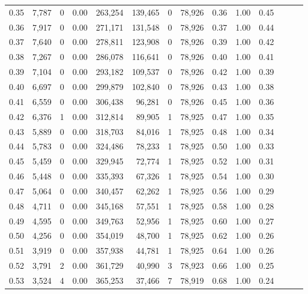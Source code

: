 \begin{tabular}{rrrrrrrrrrrrrr}
0.35 &  7,787 &      0 &  0.00 &  263,254 &  139,465 &       0 &  78,926 &  0.36 &  1.00 &      0.45 \\
0.36 &  7,917 &      0 &  0.00 &  271,171 &  131,548 &       0 &  78,926 &  0.37 &  1.00 &      0.44 \\
0.37 &  7,640 &      0 &  0.00 &  278,811 &  123,908 &       0 &  78,926 &  0.39 &  1.00 &      0.42 \\
0.38 &  7,267 &      0 &  0.00 &  286,078 &  116,641 &       0 &  78,926 &  0.40 &  1.00 &      0.41 \\
0.39 &  7,104 &      0 &  0.00 &  293,182 &  109,537 &       0 &  78,926 &  0.42 &  1.00 &      0.39 \\
0.40 &  6,697 &      0 &  0.00 &  299,879 &  102,840 &       0 &  78,926 &  0.43 &  1.00 &      0.38 \\
0.41 &  6,559 &      0 &  0.00 &  306,438 &   96,281 &       0 &  78,926 &  0.45 &  1.00 &      0.36 \\
0.42 &  6,376 &      1 &  0.00 &  312,814 &   89,905 &       1 &  78,925 &  0.47 &  1.00 &      0.35 \\
0.43 &  5,889 &      0 &  0.00 &  318,703 &   84,016 &       1 &  78,925 &  0.48 &  1.00 &      0.34 \\
0.44 &  5,783 &      0 &  0.00 &  324,486 &   78,233 &       1 &  78,925 &  0.50 &  1.00 &      0.33 \\
0.45 &  5,459 &      0 &  0.00 &  329,945 &   72,774 &       1 &  78,925 &  0.52 &  1.00 &      0.31 \\
0.46 &  5,448 &      0 &  0.00 &  335,393 &   67,326 &       1 &  78,925 &  0.54 &  1.00 &      0.30 \\
0.47 &  5,064 &      0 &  0.00 &  340,457 &   62,262 &       1 &  78,925 &  0.56 &  1.00 &      0.29 \\
0.48 &  4,711 &      0 &  0.00 &  345,168 &   57,551 &       1 &  78,925 &  0.58 &  1.00 &      0.28 \\
0.49 &  4,595 &      0 &  0.00 &  349,763 &   52,956 &       1 &  78,925 &  0.60 &  1.00 &      0.27 \\
0.50 &  4,256 &      0 &  0.00 &  354,019 &   48,700 &       1 &  78,925 &  0.62 &  1.00 &      0.26 \\
0.51 &  3,919 &      0 &  0.00 &  357,938 &   44,781 &       1 &  78,925 &  0.64 &  1.00 &      0.26 \\
0.52 &  3,791 &      2 &  0.00 &  361,729 &   40,990 &       3 &  78,923 &  0.66 &  1.00 &      0.25 \\
0.53 &  3,524 &      4 &  0.00 &  365,253 &   37,466 &       7 &  78,919 &  0.68 &  1.00 &      0.24 \\

\end{tabular}
